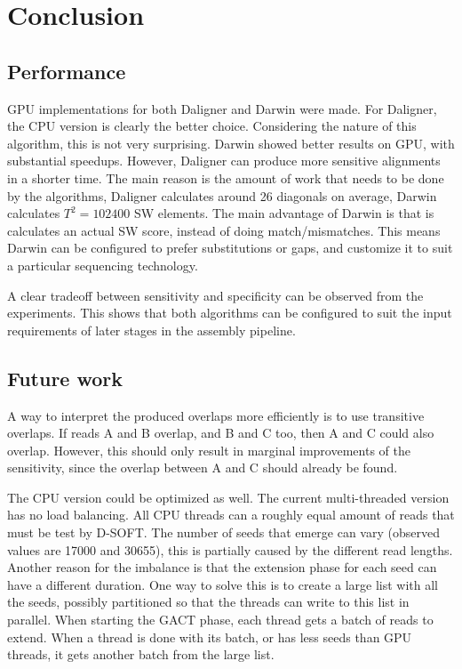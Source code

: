 \documentclass[../thesis.tex]{subfiles}
\begin{document}
\chapter{Conclusion}
\ifdefined\main
\else

\fi

\section{Performance}
GPU implementations for both Daligner and Darwin were made.
For Daligner, the CPU version is clearly the better choice.
Considering the nature of this algorithm, this is not very surprising.
Darwin showed better results on GPU, with substantial speedups. %
However, Daligner can produce more sensitive alignments in a shorter time.
The main reason is the amount of work that needs to be done by the algorithms, Daligner calculates around 26 diagonals on average, Darwin calculates $T^2=102400$ SW elements.
The main advantage of Darwin is that is calculates an actual SW score, instead of doing match/mismatches.
This means Darwin can be configured to prefer substitutions or gaps, and customize it to suit a particular sequencing technology.

A clear tradeoff between sensitivity and specificity can be observed from the experiments.
This shows that both algorithms can be configured to suit the input requirements of later stages in the assembly pipeline.


\section{Future work}





A way to interpret the produced overlaps more efficiently is to use transitive overlaps.
If reads A and B overlap, and B and C too, then A and C could also overlap.
However, this should only result in marginal improvements of the sensitivity, since the overlap between A and C should already be found.



The CPU version could be optimized as well.
The current multi-threaded version has no load balancing.
All CPU threads can a roughly equal amount of reads that must be test by D-SOFT.
The number of seeds that emerge can vary (observed values are 17000 and 30655), this is partially caused by the different read lengths.
Another reason for the imbalance is that the extension phase for each seed can have a different duration.
One way to solve this is to create a large list with all the seeds, possibly partitioned so that the threads can write to this list in parallel.
When starting the GACT phase, each thread gets a batch of reads to extend.
When a thread is done with its batch, or has less seeds than GPU threads, it gets another batch from the large list.
\end{document}
